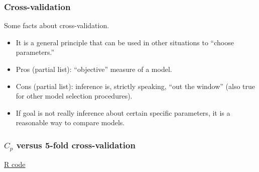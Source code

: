 \documentclass[handout]{beamer}
\begin{document}

   \begin{frame} \frametitle{Cross-validation}

   \begin{block}
   {Some facts about cross-validation.}
       \begin{itemize}

       \item It is a general principle that can be used in other situations to ``choose parameters.''

       \item Pros (partial list): ``objective'' measure of a model.

       \item Cons (partial list): inference is, strictly speaking, ``out the window'' (also true for other model selection procedures).

       \item If goal is not really inference about certain specific parameters, it is a reasonable way to compare models.
       \end{itemize}

   \end{block}
   \end{frame}



   \begin{frame}
   \frametitle{$C_p$ versus 5-fold cross-validation}
   \begin{center}
   \end{center}
   \href{http://stats191.stanford.edu/selection.html#election-example-best-subset}{R code}
   \end{frame}
\end{document}
